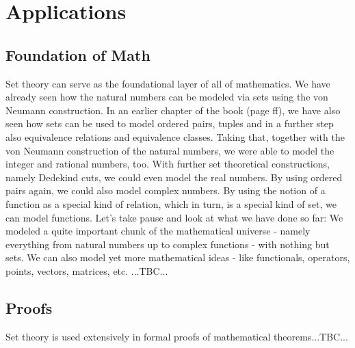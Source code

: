 \section{Applications}

\subsection{Foundation of Math}
Set theory can serve as the foundational layer of all of mathematics. We have already seen how the natural numbers can be modeled via sets using the von Neumann construction. In an earlier chapter of the book (page \pageref{Sec:NaiveSetTheory} ff), we have also seen how sets can be used to model ordered pairs, tuples and in a further step also equivalence relations and equivalence classes. Taking that, together with the von Neumann construction of the natural numbers, we were able to model the integer and rational numbers, too. With further set theoretical constructions, namely Dedekind cuts, we could even model the real numbers. By using ordered pairs again, we could also model complex numbers. By using the notion of a function as a special kind of relation, which in turn, is a special kind of set, we can model functions. Let's take pause and look at what we have done so far: We modeled a quite important chunk of the mathematical universe - namely everything from natural numbers up to complex functions - with nothing but sets. We can also model yet more mathematical ideas - like functionals, operators, points, vectors, matrices, etc. ...TBC...







\subsection{Proofs}
Set theory is used extensively in formal proofs of mathematical theorems...TBC...

